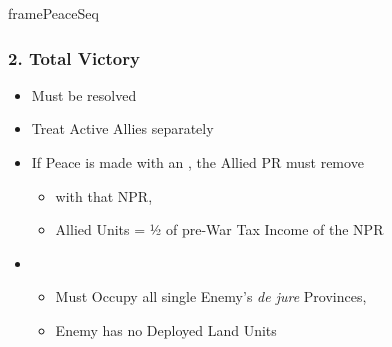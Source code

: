 \documentclass[10pt]{article}
\newlength{\fhPeaceSeq} \setlength\fhPeaceSeq{26.5\baselineskip}
\begin{document}
\begin{dynamiccontents*}{framePeaceSeq}
\begin{eubox}{\fhPeaceSeq}
\begin{multicols}{3}
		\subsubsection*{2. Total Victory}
		\begin{itemize}
			\item Must be resolved
			\item Treat Active Allies separately
			\item If Peace is made with an , the Allied PR must remove
			\begin{itemize}
				\item \alliance with that NPR, 
				\item Allied Units = ½ of pre-War Tax Income of the NPR
			\end{itemize}
			\item {}
			\begin{itemize}
				\item Must Occupy all single Enemy's \emph{de jure} Provinces, 
				\item Enemy has no Deployed Land Units
			\end{itemize}
		\end{itemize}


\end{multicols}
\end{eubox}
\end{dynamiccontents*}
\end{document}
